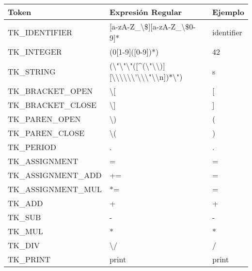 \documentclass [a4paper,titlepage]{report}
\begin{document}
\begin{longtable}{l | l | l}
\bfseries{Token}     & \bfseries{Expresión Regular}                                          & \bfseries{Ejemplo}                \tabularnewline \endhead
TK\_IDENTIFIER       & [a-zA-Z\_{}\textbackslash{}\${}][a-zA-Z\_{}\textbackslash{}\${}0-9]*  & identifier                        \tabularnewline
TK\_INTEGER          & (0\textbar{}[1-9]([0-9])*)                                            & 42                                \tabularnewline
TK\_STRING           & (\textbackslash{}"\textbackslash{}"\textbar{}\textbackslash{}"([\^{}(\textbackslash{}"\textbackslash{}\textbackslash{})]\textbar{}[\textbackslash{}\textbackslash{}\textbackslash{}\textbackslash{}\textbar{}\textbackslash{}\textbackslash{}'\textbar{}\textbackslash{}\textbackslash{}\textbackslash{}"\textbar{}\textbackslash{}\textbackslash{}n])*\textbackslash{}") & \textquotedbl{}s\textquotedbl{}   \tabularnewline
TK\_BRACKET\_OPEN    & \textbackslash{}[                                                     & [                                 \tabularnewline
TK\_BRACKET\_CLOSE   & \textbackslash{}]                                                     & ]                                 \tabularnewline
TK\_PAREN\_OPEN      & \textbackslash{})                                                     & (                                 \tabularnewline
TK\_PAREN\_CLOSE     & \textbackslash{}(                                                     & )                                 \tabularnewline
TK\_PERIOD           & .                                                                     & .                                 \tabularnewline
TK\_ASSIGNMENT       & =                                                                     & =                                 \tabularnewline
TK\_ASSIGNMENT\_ADD  & +=                                                                    & =                                 \tabularnewline
TK\_ASSIGNMENT\_MUL  & *=                                                                    & =                                 \tabularnewline
TK\_ADD              & +                                                                     & +                                 \tabularnewline
TK\_SUB              & -                                                                     & -                                 \tabularnewline
TK\_MUL              & *                                                                     & *                                 \tabularnewline
TK\_DIV              & \textbackslash{}/                                                     & /                                 \tabularnewline
TK\_PRINT            & print                                                                 & print                             \tabularnewline
\end{longtable}
\end{document}
